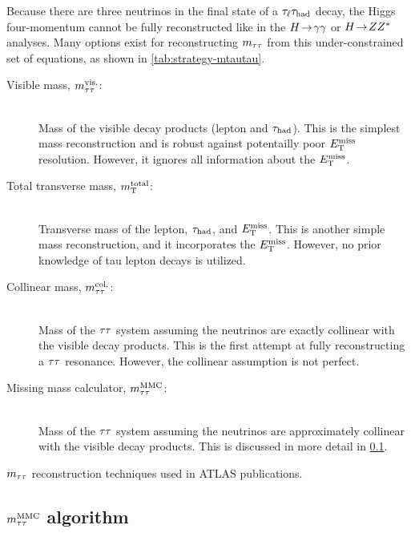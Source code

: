 Because there are three neutrinos in the final state of a $\tau_\ell\tau_\text{had}$ decay, the Higgs four-momentum cannot be fully reconstructed like in the $H \!\rightarrow\! \gamma\gamma$ or $H \!\rightarrow\! ZZ^\ast$ analyses. Many options exist for reconstructing $m_{\tau\tau}$ from this under-constrained set of equations, as shown in \cref{tab:strategy-mtautau}.
%
\begin{description}
    \item[Visible mass, $m_{\tau\tau}^\text{vis.}$:] \hfill \\
      Mass of the visible decay products (lepton and $\tau_\text{had}$). This is the simplest mass reconstruction and is robust against potentailly poor $E_{\mathrm{T}}^{\mathrm{miss}}$ resolution. However, it ignores all information about the $E_{\mathrm{T}}^{\mathrm{miss}}$.
    \item[Total transverse mass, $m_{\text{T}}^\text{total}$:] \hfill \\
      Transverse mass of the lepton, $\tau_\text{had}$, and $E_{\mathrm{T}}^{\mathrm{miss}}$. This is another simple mass reconstruction, and it incorporates the $E_{\mathrm{T}}^{\mathrm{miss}}$. However, no prior knowledge of tau lepton decays is utilized.
    \item[Collinear mass, $m_{\tau\tau}^\text{col.}$:] \hfill \\
      Mass of the $\tau\tau$ system assuming the neutrinos are exactly collinear with the visible decay products. This is the first attempt at fully reconstructing a $\tau\tau$ resonance. However, the collinear assumption is not perfect.
    \item[Missing mass calculator, $m_{\tau\tau}^\text{MMC}$:] \hfill \\
      Mass of the $\tau\tau$ system assuming the neutrinos are approximately collinear with the visible decay products. This is discussed in more detail in \cref{sec:strategy-mtautau-mMMC}.
\end{description}
%

\begin{table}[bp]
  \centering
  \renewcommand{\arraystretch}{1.4}
  \caption{$m_{\tau\tau}$ reconstruction techniques used in ATLAS publications.}
  
  \label{tab:strategy-mtautau}
\end{table}

\subsection{$m_{\tau\tau}^\text{MMC}$ algorithm}
\label{sec:strategy-mtautau-mMMC}

